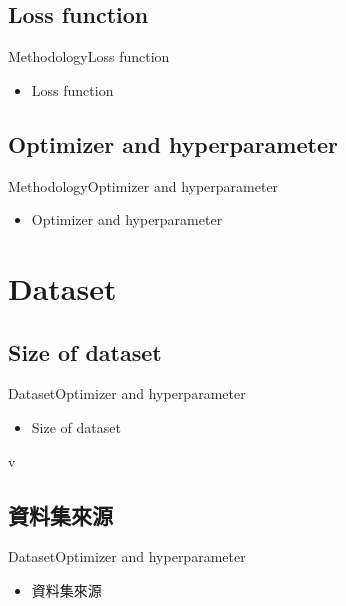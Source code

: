 \documentclass{beamer}
\begin{document}
\begin{CJK}{UTF8}{}
\subsection{Loss function}

\begin{frame}{Methodology}{Loss function}
	\begin{itemize}
	\item{
		Loss function
	}
	\end{itemize}
\end{frame}

\subsection{Optimizer and hyperparameter}

\begin{frame}{Methodology}{Optimizer and hyperparameter}
	\begin{itemize}
	\item{
		Optimizer and hyperparameter
	}
	\end{itemize}
\end{frame}

\section{Dataset}

\subsection{Size of dataset}

\begin{frame}{Dataset}{Optimizer and hyperparameter}
	\begin{itemize}
	\item{
		Size of dataset
	}
	\end{itemize}
\end{frame}v

\subsection{資料集來源}

\begin{frame}{Dataset}{Optimizer and hyperparameter}
	\begin{itemize}
	\item{
		資料集來源
	}
	\end{itemize}
\end{frame}


\end{CJK}
\end{document}
